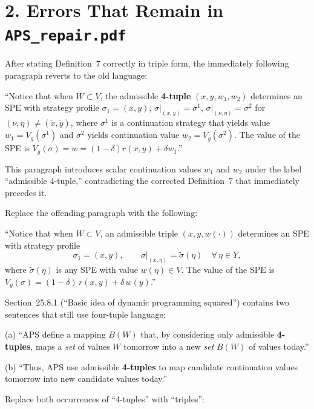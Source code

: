 \section{2. Errors That Remain in {\tt APS\_repair.pdf}}


After stating Definition~7 correctly in triple form, the immediately
following paragraph reverts to the old language:

\bquote
``Notice that when $W\subset V$, the admissible {\bf 4-tuple}
$(x,y,w_1,w_2)$ determines an SPE with strategy profile
$\sigma_1=(x,y)$, $\sigma|_{(x,y)}=\sigma^1$,
$\sigma|_{(\nu,\eta)}=\sigma^2$ for $(\nu,\eta)\ne(\tilde x,\tilde y)$,
where $\sigma^1$ is a continuation strategy that yields value
$w_1=V_g(\sigma^1)$ and $\sigma^2$ yields continuation value
$w_2=V_g(\sigma^2)$.  The value of the SPE is
$V_g(\sigma)=w=(1-\delta)r(x,y)+\delta w_1$.''
\ebquote

This paragraph introduces scalar continuation values $w_1$ and $w_2$
under the label ``admissible 4-tuple,'' contradicting the corrected
Definition~7 that immediately precedes it.

\vskip6pt\enspace
Replace the offending paragraph with the following:

\bquote
``Notice that when $W\subset V$, an admissible triple $(x,y,w(\cdot))$
determines an SPE with strategy profile
$$\sigma_1=(x,y),\qquad \sigma|_{(x,\eta)}=\tilde\sigma(\eta)
  \quad\forall\,\eta\in Y,$$
where $\tilde\sigma(\eta)$ is any SPE with value $w(\eta)\in V$.
The value of the SPE is
$V_g(\sigma)=(1-\delta)\,r(x,y)+\delta\,w(y)$.''
\ebquote


Section~25.8.1 (``Basic idea of dynamic programming squared'') contains
two sentences that still use four-tuple language:

\vskip4pt
\noindent (a) ``APS define a mapping $B(W)$ that, by considering only
admissible {\bf 4-tuples}, maps a {\it set\/} of values $W$ tomorrow
into a new {\it set\/} $B(W)$ of values today.''

\vskip2pt
\noindent (b) ``Thus, APS use admissible {\bf 4-tuples} to map candidate
continuation values tomorrow into new candidate values today.''

\vskip6pt\enspace
Replace both occurrences of ``4-tuples'' with ``triples'':

